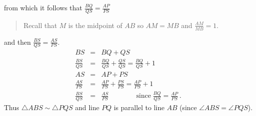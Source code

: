 \documentclass[11pt,a4paper]{article}
\newcommand*{\disfrac}[2]{\displaystyle\frac{#1}{#2}}
\begin{document}
from which it follows that $\frac{BQ}{QS}=\frac{AP}{PS}$
\begin{quote}
\vspace*{-8pt}
Recall that $M$ is the midpoint of $AB$ so $AM=MB$ and $\frac{AM}{MB}=1$.
\vspace*{-8pt}
\end{quote}
and then $\frac{BS}{QS}=\frac{AS}{PS}$.
\[
\renewcommand*{\arraystretch}{1.7}
\begin{array}{rcl}
BS&=&BQ+QS\\
\disfrac{BS}{QS}&=&\disfrac{BQ}{QS}+\disfrac{QS}{QS} = \disfrac{BQ}{QS}+1\\
AS&=&AP+PS\\
\disfrac{AS}{PS} &=& \disfrac{AP}{PS} + \disfrac{PS}{PS} = \disfrac{AP}{PS} + 1\\
\disfrac{BS}{QS}&=&\disfrac{AS}{PS} \quad\quad\quad\quad \textrm{since}\;\disfrac{BQ}{QS}=\disfrac{AP}{PS}\,.
\end{array}
\]
Thus $\triangle ABS \sim \triangle PQS$ and line $PQ$ is parallel to line $AB$ (since $\angle ABS = \angle PQS$).
\end{document}
